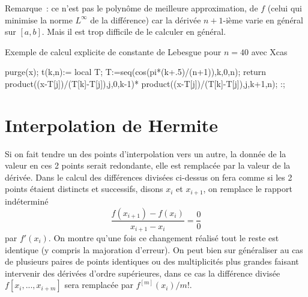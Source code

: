 \documentclass[a4paper,11pt]{book}
\begin{document}
\begin{giacjshere}
Remarque~: ce n'est pas le polyn\^ome de meilleure approximation,
de $f$ (celui qui minimise la norme $L^\infty$ de la diff\'erence)
car la d\'eriv\'ee $n+1$-i\`eme varie en g\'en\'eral sur $[a,b]$. Mais
il est trop difficile de le calculer en g\'en\'eral.

Exemple de calcul explicite de constante de Lebesgue pour $n=40$ avec
Xcas
\begin{giacprog}
purge(x);
t(k,n):={ 
 local T; 
 T:=seq(cos(pi*(k+.5)/(n+1)),k,0,n);
 return product((x-T[j])/(T[k]-T[j]),j,0,k-1)*
  product((x-T[j])/(T[k]-T[j]),j,k+1,n);
}:;
\end{giacprog}

\section{Interpolation de Hermite}
Si on fait tendre un des points d'interpolation vers un autre, la
donn\'ee de la valeur en ces 2 points serait redondante, elle 
est remplac\'ee par la valeur de la d\'eriv\'ee. Dans le calcul
des diff\'erences divis\'ees ci-dessus on fera comme si les
2 points \'etaient distincts et successifs, disons $x_i$ et $x_{i+1}$,
on remplace le rapport ind\'etermin\'e 
\[ \frac{f(x_{i+1})-f(x_i)}{x_{i+1}-x_i} = \frac{0}{0} \]
par $f'(x_i)$.
On montre qu'une fois ce changement r\'ealis\'e
tout le reste est identique (y compris la majoration d'erreur).
On peut bien sur g\'en\'eraliser au cas de plusieurs paires de points 
identiques ou des multiplicit\'es plus grandes faisant intervenir
des d\'eriv\'ees d'ordre sup\'erieures, dans ce cas la diff\'erence
divis\'ee $f[x_i,...,x_{i+m}]$ sera remplac\'ee par $f^{[m]}(x_i)/m!$.


\end{giacjshere}
\end{document}
